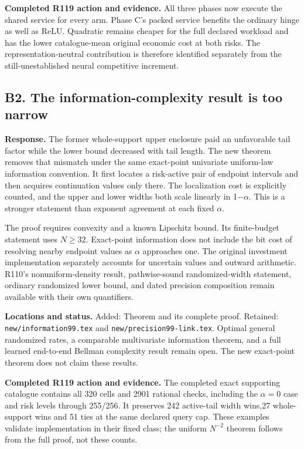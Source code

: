 \textbf{Completed R119 action and evidence.} All three phases now execute the shared service for every arm. Phase C's packed service benefits the ordinary hinge as well as ReLU. Quadratic remains cheaper for the full declared workload and has the lower catalogue-mean original economic cost at both risks. The representation-neutral contribution is therefore identified separately from the still-unestablished neural competitive increment.

\hypertarget{b2.-the-information-complexity-result-is-too-narrow}{%
\subsection{B2. The information-complexity result is too narrow}\label{b2.-the-information-complexity-result-is-too-narrow}}

\textbf{Response.} The former whole-support upper enclosure paid an unfavorable tail factor while the lower bound decreased with tail length. The new theorem removes that mismatch under the same exact-point univariate uniform-law information convention. It first locates a risk-active pair of endpoint intervals and then acquires continuation values only there. The localization cost is explicitly counted, and the upper and lower widths both scale linearly in 1\ensuremath{-}\ensuremath{\alpha}. This is a stronger statement than exponent agreement at each fixed \ensuremath{\alpha}.

The proof requires convexity and a known Lipschitz bound. Its finite-budget statement uses \(N\ge32\). Exact-point information does not include the bit cost of resolving nearby endpoint values as \(\alpha\) approaches one. The original investment implementation separately accounts for uncertain values and outward arithmetic. R110's nonuniform-density result, pathwise-sound randomized-width statement, ordinary randomized lower bound, and dated precision composition remain available with their own quantifiers.

\textbf{Locations and status.} Added: Theorem  and its complete proof. Retained: \nolinkurl{new/information99.tex} and \nolinkurl{new/precision99-link.tex}. Optimal general randomized rates, a comparable multivariate information theorem, and a full learned end-to-end Bellman complexity result remain open. The new exact-point theorem does not claim these results.

\textbf{Completed R119 action and evidence.} The completed exact supporting catalogue contains all 320 cells and 2901 rational checks, including the \(\alpha=0\) case and risk levels through 255/256. It preserves 242 active-tail width wins,27 whole-support wins and 51 ties at the same declared query cap. These examples validate implementation in their fixed class; the uniform \(N^{-2}\) theorem follows from the full proof, not these counts.

